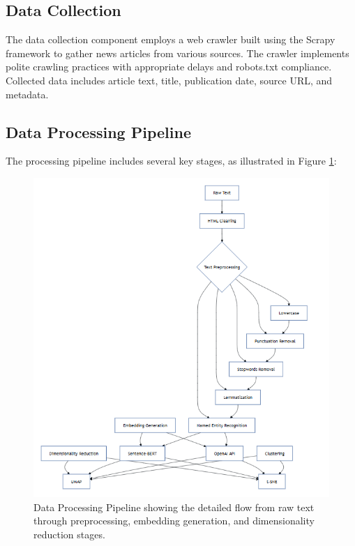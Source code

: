 \documentclass[conference]{IEEEtran}
\begin{document}
\subsection{Data Collection}
The data collection component employs a web crawler built using the Scrapy framework \cite{scrapy2021} to gather news articles from various sources. The crawler implements polite crawling practices with appropriate delays and robots.txt compliance. Collected data includes article text, title, publication date, source URL, and metadata.

\subsection{Data Processing Pipeline}
The processing pipeline includes several key stages, as illustrated in Figure \ref{fig:dataflow}:

\begin{figure}[!t]
\centering
\includegraphics[width=\textwidth]{images/system-diagram.png}
\caption{Data Processing Pipeline showing the detailed flow from raw text through preprocessing, embedding generation, and dimensionality reduction stages.}
\label{fig:dataflow}
\end{figure}
\end{document}
